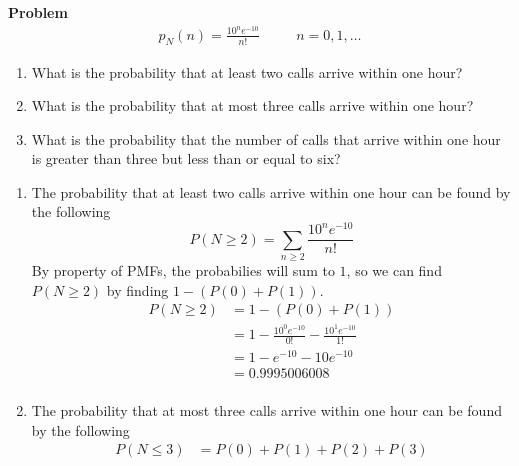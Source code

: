 \documentclass[12pt]{article}
\newenvironment{Ex}{\textbf{Problem}\vspace{.75em}\\}{}
\begin{document}
\begin{enumerate}
\begin{Ex}
      \begin{equation*}
        \begin{aligned}
          p_N(n) = \frac{10^ne^{-10}}{n!} \quad && n = 0, 1, \ldots
        \end{aligned}
      \end{equation*}
      \begin{enumerate}
      \item What is the probability that at least two calls arrive
        within one hour?
      \item What is the probability that at most three calls arrive
        within one hour?
      \item What is the probability that the number of calls that
        arrive within one hour is greater than three but less than or
        equal to six?
      \end{enumerate}
      \begin{solution} \hfill
        \begin{enumerate}
        \item The probability that at least two calls arrive within
          one hour can be found by the following
          \begin{equation}
            \label{eq:2a-desc}
            P(N \ge 2) = \sum_{n \ge 2}\frac{10^ne^{-10}}{n!}
          \end{equation}
          By property of PMFs, the probabilies will sum to $1$, so we
          can find $P(N \ge 2)$ by finding $1 - (P(0) + P(1))$.
          \begin{equation}
            \label{eq:2a-sol}
            \begin{aligned}
              P(N \ge 2) &= 1 - (P(0) + P(1)) \\
              &= 1 - \frac{10^0e^{-10}}{0!} - \frac{10^1e^{-10}}{1!} \\
              &= 1 - e^{-10} - 10e^{-10} \\
              &= 0.9995006008 \\
            \end{aligned}
          \end{equation}
        \item The probability that at most three calls arrive within
          one hour can be found by the following
          \begin{equation}
            \label{eq:1b-sol}
            \begin{aligned}
              P(N \le 3) &= P(0) + P(1) + P(2) + P(3) \\

\end{aligned}
\end{equation}
\end{enumerate}
\end{solution}
\end{Ex}
\end{enumerate}
\end{document}
